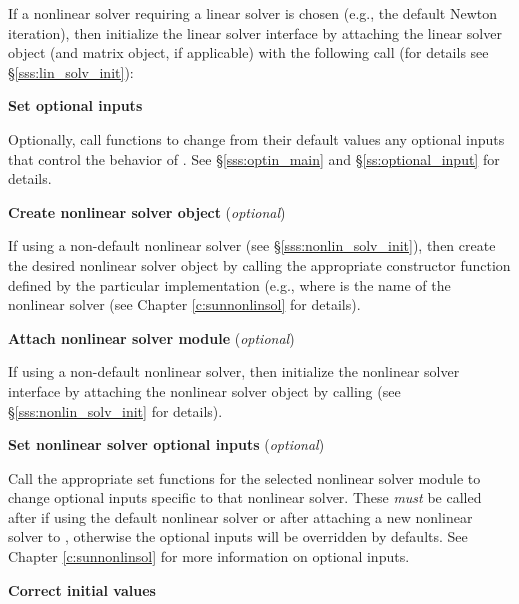 \begin{Steps}
  If a nonlinear solver requiring a linear solver is chosen (e.g., the default
  Newton iteration), then initialize the {\idals} linear solver
  interface by attaching the linear solver object (and matrix object, if
  applicable) with the following call (for details see
  \S\ref{sss:lin_solv_init}):


\item
  {\bf Set optional inputs}

  Optionally, call  functions to change from their default values any
  optional inputs that control the behavior of {\ida}.
  See \S\ref{sss:optin_main} and \S\ref{ss:optional_input} for details.

\item\label{i:nonlin_solver}
  {\bf Create nonlinear solver object} (\textit{optional})

  If using a non-default nonlinear solver (see \S\ref{sss:nonlin_solv_init}),
  then create the desired nonlinear solver object by calling the appropriate
  constructor function defined by the particular {\sunnonlinsol} implementation
  (e.g.,  where \id{***} is the name of the
  nonlinear solver (see Chapter \ref{c:sunnonlinsol} for details).

\item\label{i:nonlin_solver_interface}
  {\bf Attach nonlinear solver module} (\textit{optional})

  If using a non-default nonlinear solver, then initialize the nonlinear solver
  interface by attaching the nonlinear solver object by calling
    (see
  \S\ref{sss:nonlin_solv_init} for details).

\item
  {\bf Set nonlinear solver optional inputs} (\textit{optional})

  Call the appropriate set functions for the selected nonlinear solver module to
  change optional inputs specific to that nonlinear solver. These \textit{must}
  be called after  if using the default nonlinear solver or after
  attaching a new nonlinear solver to {\ida}, otherwise the optional inputs will
  be overridden by {\ida} defaults. See Chapter \ref{c:sunnonlinsol} for more
  information on optional inputs.

\item
  {\bf Correct initial values}


\end{Steps}
